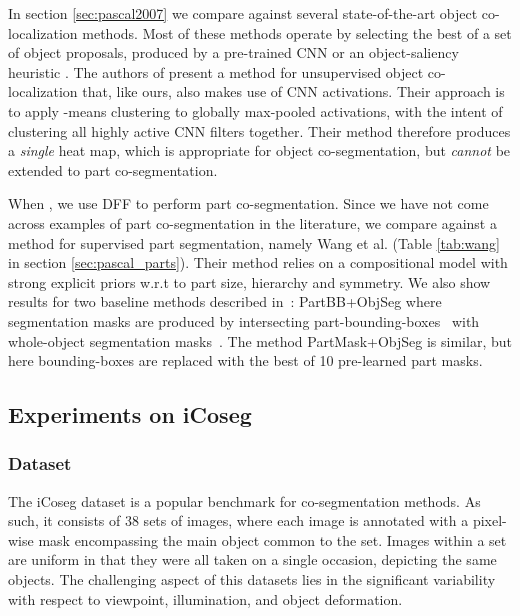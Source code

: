 \documentclass[runningheads]{llncs}
\begin{document}
	In section \ref{sec:pascal2007} we compare against several state-of-the-art object co-localization methods.
	Most of these methods operate by selecting the best of a set of object proposals, produced by a pre-trained CNN \cite{li2016image} or an object-saliency heuristic \cite{cho2015,joulin2014}.
	The authors of \cite{le2017co} present a method for unsupervised object co-localization that, like ours, also makes use of CNN activations. Their approach is to apply -means clustering to globally max-pooled activations, with the intent of clustering all highly active CNN filters together. Their method therefore produces a \emph{single} heat map, which is appropriate for object co-segmentation, but \emph{cannot} be extended to part co-segmentation.
	
	When  , we use DFF to perform part co-segmentation. Since we have not come across examples of part co-segmentation in the literature, we compare against a method for supervised part segmentation, namely Wang et al. \cite{wang2015semantic} (Table \ref{tab:wang} in section \ref{sec:pascal_parts}).  Their method relies on a compositional model with strong explicit priors w.r.t to part size, hierarchy and symmetry. We also show results for two baseline methods described in~\cite{wang2015semantic}: PartBB+ObjSeg where segmentation masks are produced by intersecting part-bounding-boxes~\cite{Chen2014} with whole-object segmentation masks~\cite{BharathECCV2014}. The method PartMask+ObjSeg is similar, but here bounding-boxes are replaced with the best of 10 pre-learned part masks.
	
	
	
	\subsection{Experiments on iCoseg} \label{sec:icoseg}
	
	\subsubsection{Dataset}
	The iCoseg dataset \cite{batra2010icoseg} is a popular benchmark for co-segmentation methods. As such, it consists of 38 sets of images, where each image is annotated with a pixel-wise mask encompassing the main object common to the set.
	Images within a set are uniform in that they were all taken on a single occasion, depicting the same objects. The challenging aspect of this datasets lies in the significant variability with respect to viewpoint, illumination, and object deformation.
	
\end{document}
